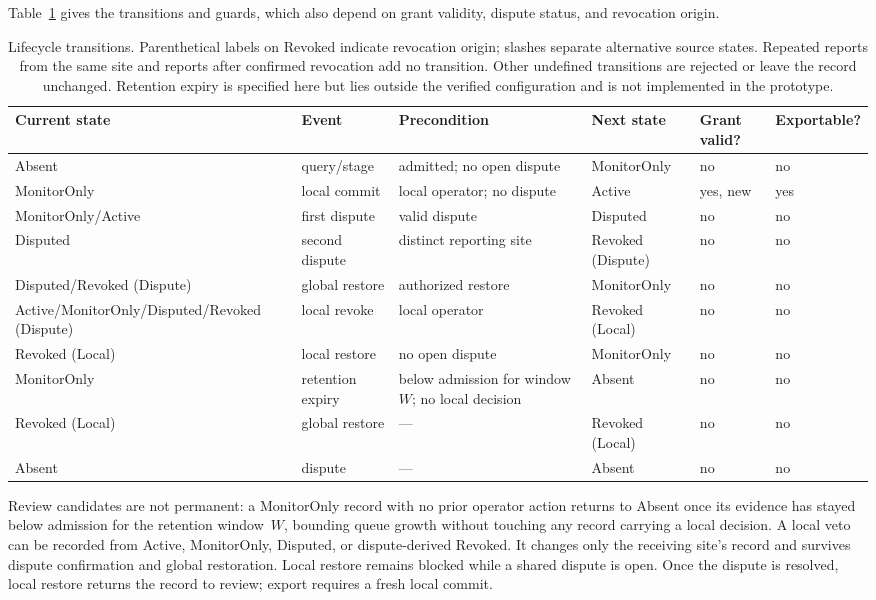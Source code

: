\documentclass[journal]{IEEEtran}
\theoremstyle{definition}
\begin{document}
Table~\ref{tab:transitions} gives the transitions and guards, which also depend on grant validity, dispute status, and revocation origin.
\begin{table}[ht]
\centering
\caption{Lifecycle transitions. Parenthetical labels on Revoked indicate revocation origin; slashes separate alternative source states. Repeated reports from the same site and reports after confirmed revocation add no transition. Other undefined transitions are rejected or leave the record unchanged. Retention expiry is specified here but lies outside the verified configuration and is not implemented in the prototype.}
\label{tab:transitions}
\scriptsize
\begin{tabular}{@{}llllll@{}}
\toprule
Current state & Event & Precondition & Next state & Grant valid? & Exportable? \\
\midrule
Absent & query/stage & admitted; no open dispute & MonitorOnly & no & no \\
MonitorOnly & local commit & local operator; no dispute & Active & yes, new & yes \\
MonitorOnly/Active & first dispute & valid dispute & Disputed & no & no \\
Disputed & second dispute & distinct reporting site & Revoked (Dispute) & no & no \\
Disputed/Revoked (Dispute) & global restore & authorized restore & MonitorOnly & no & no \\
Active/MonitorOnly/Disputed/Revoked (Dispute) & local revoke & local operator & Revoked (Local) & no & no \\
Revoked (Local) & local restore & no open dispute & MonitorOnly & no & no \\
MonitorOnly & retention expiry & below admission for window $W$; no local decision & Absent & no & no \\
Revoked (Local) & global restore & --- & Revoked (Local) & no & no \\
Absent & dispute & --- & Absent & no & no \\
\bottomrule
\end{tabular}
\end{table}

Review candidates are not permanent: a MonitorOnly record with no prior operator action returns to Absent once its evidence has stayed below admission for the retention window~$W$, bounding queue growth without touching any record carrying a local decision. A local veto can be recorded from Active, MonitorOnly, Disputed, or dispute-derived Revoked. It changes only the receiving site's record and survives dispute confirmation and global restoration. Local restore remains blocked while a shared dispute is open. Once the dispute is resolved, local restore returns the record to review; export requires a fresh local commit.
\end{document}
